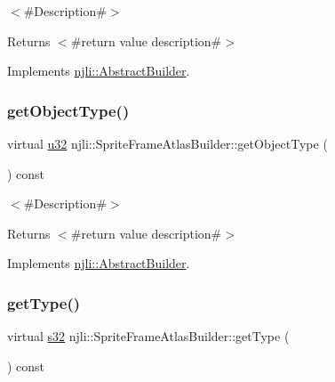 $<$\#\+Description\#$>$

\begin{DoxyReturn}{Returns}
$<$\#return value description\#$>$ 
\end{DoxyReturn}


Implements \mbox{\hyperlink{classnjli_1_1_abstract_builder_a902f73ea78031b06aca183a417f3413b}{njli\+::\+Abstract\+Builder}}.

\mbox{\label{classnjli_1_1_sprite_frame_atlas_builder_ae0ec0c5ec24e4d3c33f80caab2d09c82}} 
\subsubsection{\texorpdfstring{get\+Object\+Type()}{getObjectType()}}
{\footnotesize\ttfamily virtual \mbox{\hyperlink{_util_8h_a10e94b422ef0c20dcdec20d31a1f5049}{u32}} njli\+::\+Sprite\+Frame\+Atlas\+Builder\+::get\+Object\+Type (\begin{DoxyParamCaption}{ }\end{DoxyParamCaption}) const\hspace{0.3cm}{\ttfamily [virtual]}}

$<$\#\+Description\#$>$

\begin{DoxyReturn}{Returns}
$<$\#return value description\#$>$ 
\end{DoxyReturn}


Implements \mbox{\hyperlink{classnjli_1_1_abstract_builder_a0f2d344fcf697b167f4f2b1122b5fb33}{njli\+::\+Abstract\+Builder}}.

\mbox{\label{classnjli_1_1_sprite_frame_atlas_builder_ae452aafd5f7b3bec5944662ffbce3741}} 
\subsubsection{\texorpdfstring{get\+Type()}{getType()}}
{\footnotesize\ttfamily virtual \mbox{\hyperlink{_util_8h_aa62c75d314a0d1f37f79c4b73b2292e2}{s32}} njli\+::\+Sprite\+Frame\+Atlas\+Builder\+::get\+Type (\begin{DoxyParamCaption}{ }\end{DoxyParamCaption}) const\hspace{0.3cm}{\ttfamily [virtual]}}

